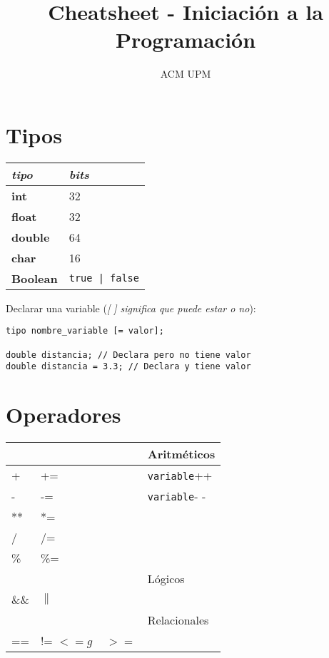 \documentclass[10pt,twocolumn]{article}
\title{Cheatsheet - Iniciación a la Programación}
\author{ACM UPM}
\begin{document}
\maketitle

\section{Tipos}
\label{sec:tipos}

\begin{table}[h!]
  \centering
  \begin{tabular}[h]{p{3cm} p{3cm}}
    \hline
    \emph{tipo}     & \emph{bits} \\ \hline
    \textbf{int}    & 32 \\
    \textbf{float}  & 32 \\
    \textbf{double} & 64 \\
    \textbf{char}   & 16 \\
    \textbf{Boolean}& \texttt{true | false} \\ \hline
  \end{tabular}
\end{table}

Declarar una variable (\emph{[ ] significa que puede estar o no}):

\begin{verbatim}
tipo nombre_variable [= valor];

double distancia; // Declara pero no tiene valor
double distancia = 3.3; // Declara y tiene valor
\end{verbatim}

\section{Operadores}
\label{sec:operadores}

\begin{table}[h]
  \begin{tabular}[h]{l l l}
    \hline
    && Aritméticos \\ \hline
    +    & +=   & \texttt{variable}++\\ 
    -    & -=   & \texttt{variable}- -\\
    **   & *=   & \\
    /    & /=   & \\
    \%   & \%=  & \\ \hline
    && Lógicos \\\hline
    \&\& & $\parallel$ & \\ \hline
    && Relacionales \\\hline
     ==  & != $<=g$ ~ $>=$  & \\
  \end{tabular}
\end{table}
\end{document}
